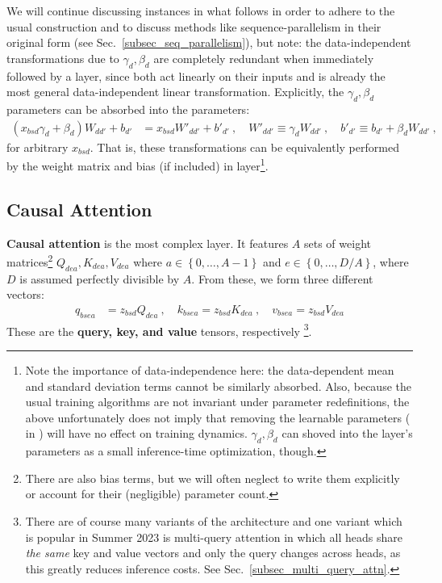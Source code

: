 \documentclass[11pt]{article}
\begin{document}
We will continue discussing  instances in what follows in order to adhere to the
usual construction and to discuss methods like sequence-parallelism in their original form (see
Sec.~\ref{subsec_seq_parallelism}), but note: the data-independent 
transformations due to $  \gamma _{ d }, \beta _{ d } $ are completely redundant when immediately
followed by a  layer, since both act linearly on their inputs and 
is already the most general data-independent linear transformation. Explicitly, the  $ \gamma _{ d
}, \beta _{ d } $ parameters can be absorbed into the  parameters:
\begin{align}
	\left (     x _{ bsd } \gamma _{ d } + \beta _{ d } \right )  W _{d d'}    + b _{ d' } & = x _{ bsd }
	W' _{ d d' } + b' _{ d' } \ , \quad W' _{ d d' } \equiv  \gamma _{  d} W _{ d d' } \ , \quad b' _{
	d' } \equiv b _{ d' } + \beta _{ d }W _{ d d' } \ ,
\end{align}
for arbitrary $ x _{ bsd } $. That is, these transformations can be equivalently performed by the
weight matrix and bias (if included) in  layer\footnote{Note the importance of
    data-independence here: the data-dependent mean and standard deviation terms cannot be similarly
    absorbed.  Also, because the usual training algorithms are not invariant under parameter
    redefinitions, the above unfortunately does not imply that removing the learnable
     parameters ( in ) will
have no effect on training dynamics. $ \gamma _{ d }, \beta _{ d } $ can shoved into the
 layer's parameters as a small inference-time optimization, though.}.

\subsection{Causal Attention \label{subsubsec_attn_layer} }

\textbf{Causal attention} is the most complex layer. It features $ A $  sets of weight
matrices\footnote{There are also bias terms, but we will often neglect to write them explicitly or
    account for their (negligible)
	parameter count.}  $ Q  _{ d e a}, K  _{ de a}, V  _{ dea }  $
where $ a \in \left \{ 0, \ldots, A-1 \right \} $ and $ e \in \left \{ 0, \ldots, D/A \right \} $,
where $ D $ is assumed perfectly divisible by $ A $.
From these, we form three different vectors:
\begin{align}
	q _{ bsea } & = z _{ bsd } Q _{ dea } \ , \quad
	k _{ bsea } = z _{ bsd } K _{ dea }  \ , \quad
	v _{ bsea } = z _{ bsd } V _{ dea }
\end{align}
These are the \textbf{query, key, and value} tensors, respectively \footnote{There are of course
	many variants of the architecture and one variant which is popular in Summer 2023 is multi-query
	attention \cite{shazeer2019fast} in which all heads share \textit{the same} key and value vectors
    and only the query changes across heads, as this greatly reduces inference costs. See
Sec.~\ref{subsec_multi_query_attn}.}.
\end{document}
